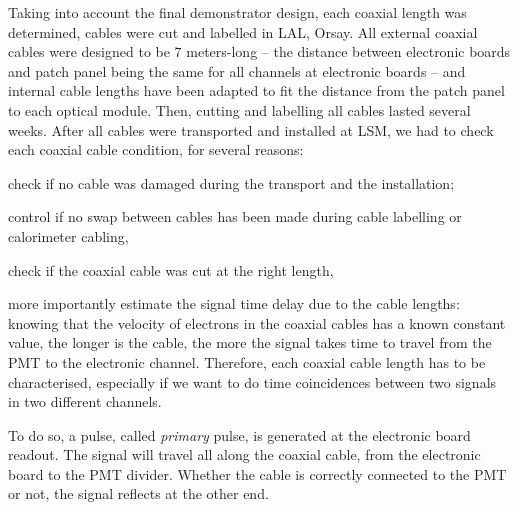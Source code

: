 Taking into account the final demonstrator design, each coaxial length was determined, cables were cut and labelled in LAL, Orsay.
All external coaxial cables were designed to be $7$ meters-long -- the distance between electronic boards and patch panel being the same for all channels at electronic boards -- and internal cable lengths have been adapted to fit the distance from the patch panel to each optical module.
Then, cutting and labelling all cables lasted several weeks.
After all cables were transported and installed at LSM, we had to check each coaxial cable condition, for several reasons:
\begin{itemize*}
\item check if no cable was damaged during the transport and the installation;
\item control if no swap between cables has been made during cable labelling or calorimeter cabling,
\item check if the coaxial cable was cut at the right length,
\item more importantly estimate the signal time delay due to the cable lengths: knowing that the velocity of electrons in the coaxial cables has a known constant value, the longer is the cable, the more the signal takes time to travel from the PMT to the electronic channel.
  Therefore, each coaxial cable length has to be characterised, especially if we want to do time coincidences between two signals in two different channels.
\end{itemize*}
To do so, a pulse, called \emph{primary} pulse, is generated at the electronic board readout.
The signal will travel all along the coaxial cable, from the electronic board to the PMT divider.
Whether the cable is correctly connected to the PMT or not, the signal reflects at the other end.
